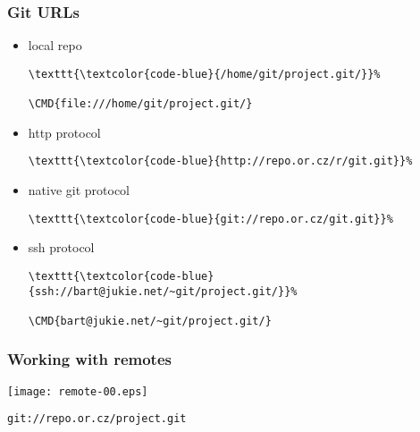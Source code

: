 \documentclass[english]{beamer}
\newcommand{\CMD}[1]{%
\texttt{\textcolor{code-blue}{#1}}%
}
\begin{document}
\begin{frame}[fragile]
\frametitle{Git URLs}

\begin{itemize}
        \item local repo \\
                \begin{Verbatim}[commandchars=\\\{\}]
\CMD{/home/git/project.git/}
\CMD{file:///home/git/project.git/}
                \end{Verbatim}
                \vspace{\baselineskip}


        \item http protocol \\
                \begin{Verbatim}[commandchars=\\\{\}]
\CMD{http://repo.or.cz/r/git.git}
                \end{Verbatim}
                \vspace{\baselineskip}


        \item native git protocol
                \begin{Verbatim}[commandchars=\\\{\}]
\CMD{git://repo.or.cz/git.git}
                \end{Verbatim}
                \vspace{\baselineskip}


        \item ssh protocol
                \begin{Verbatim}[commandchars=\\\{\}]
\CMD{ssh://bart@jukie.net/~git/project.git/}
\CMD{bart@jukie.net/~git/project.git/}
                \end{Verbatim}
\end{itemize}
\end{frame}

\begin{frame}
\frametitle{Working with remotes}

\texttt{[image: remote-00.eps]}

\begin{center}
\CMD{git://repo.or.cz/project.git}
\end{center}
\vspace{\textheight}
\end{frame}
\end{document}
